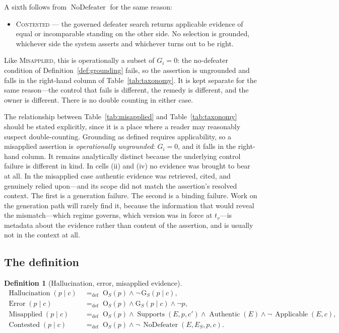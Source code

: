 \documentclass[11pt]{article}
\newcommand{\Out}{\mathrm{O}}          %
\newcommand{\Grd}{\mathrm{G}}          %
\newcommand{\Hall}{\operatorname{Hallucination}}
\newcommand{\Err}{\operatorname{Error}}
\newcommand{\Misapplied}{\operatorname{Misapplied}}
\newcommand{\Supports}{\operatorname{Supports}}
\newcommand{\Applicable}{\operatorname{Applicable}}
\newcommand{\Authentic}{\operatorname{Authentic}}
\newcommand{\NoDefeater}{\operatorname{NoDefeater}}
\newcommand{\Contested}{\operatorname{Contested}}
\theoremstyle{plain}
\theoremstyle{definition}
\newtheorem{definition}{Definition}
\begin{document}
A sixth follows from $\NoDefeater$ for the same reason:

\begin{itemize}
  \item[\textsc{(vi)}] \textsc{Contested} --- the governed defeater search returns
        applicable evidence of equal or incomparable standing on the other side. No
        selection is grounded, whichever side the system asserts and whichever turns out
        to be right.
\end{itemize}

Like \textsc{Misapplied}, this is operationally a subset of $G_i = 0$: the no-defeater
condition of Definition~\ref{def:grounding} fails, so the assertion is ungrounded and
falls in the right-hand column of Table~\ref{tab:taxonomy}. It is kept separate for the
same reason---the control that fails is different, the remedy is different, and the
owner is different. There is no double counting in either case.

The relationship between Table~\ref{tab:misapplied} and Table~\ref{tab:taxonomy}
should be stated explicitly, since it is a place where a reader may reasonably
suspect double-counting. Grounding as defined requires applicability, so a
misapplied assertion is \emph{operationally ungrounded}: $G_i = 0$, and it falls in
the right-hand column. It remains analytically distinct because the underlying
control failure is different in kind. In cells (ii) and (iv) no evidence was
brought to bear at all. In the misapplied case authentic evidence was retrieved,
cited, and genuinely relied upon---and its scope did not match the assertion's
resolved context. The first is a generation failure. The second is a binding
failure. Work on the generation path will rarely find it, because the information that
would reveal the mismatch---which regime governs, which version was in force at
$t_v$---is metadata about the evidence rather than content of the assertion, and is
usually not in the context at all.

\subsection{The definition}
\label{sec:hall-def}

\begin{definition}[Hallucination, error, misapplied evidence]
\label{def:hallucination}
\begin{align}
  \Hall(p \mid c)       &\;=_{\mathrm{def}}\; \Out_S(p) \wedge \neg\,\Grd_S(p \mid c), \label{eq:hall}\\
  \Err(p \mid c)        &\;=_{\mathrm{def}}\; \Out_S(p) \wedge \Grd_S(p \mid c) \wedge \neg p, \label{eq:err}\\
  \Misapplied(p \mid c) &\;=_{\mathrm{def}}\; \Out_S(p) \wedge \Supports(E, p, c')
                           \wedge \Authentic(E) \wedge \neg\,\Applicable(E, c),
                           \label{eq:misapplied}\\
  \Contested(p \mid c)  &\;=_{\mathrm{def}}\; \Out_S(p) \wedge \neg\,\NoDefeater(E, E_S, p, c).
                           \label{eq:contested}
\end{align}
\end{definition}
\end{document}
